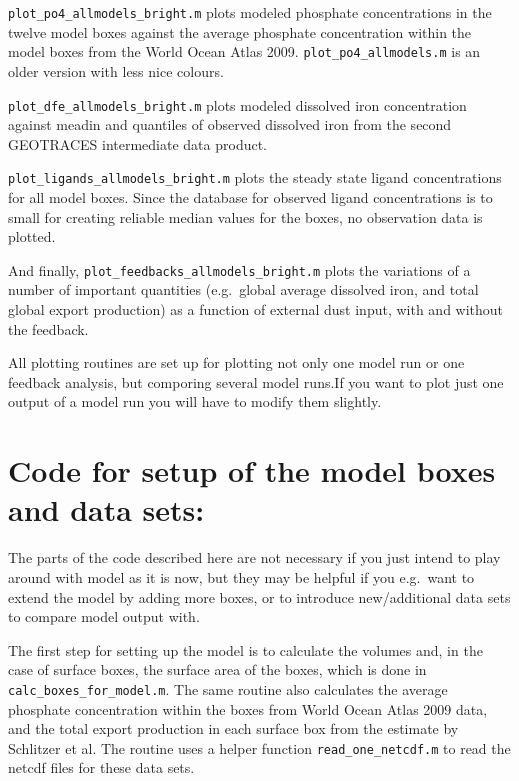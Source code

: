 \documentclass[a4paper]{scrartcl}
\begin{document}
\verb+plot_po4_allmodels_bright.m+ plots modeled phosphate
concentrations in the twelve model boxes against the average phosphate
concentration within the model boxes from the World Ocean Atlas
2009. \verb+plot_po4_allmodels.m+ is an older version with less nice
colours.

\verb+plot_dfe_allmodels_bright.m+ plots modeled dissolved iron
concentration against meadin and quantiles of observed dissolved iron
from the second GEOTRACES intermediate data product.

\verb+plot_ligands_allmodels_bright.m+ plots the steady state ligand
concentrations for all model boxes. Since the database for observed
ligand concentrations is to small for creating reliable median values
for the boxes, no observation data is plotted.

And finally, \verb+plot_feedbacks_allmodels_bright.m+ plots the
variations of a number of important quantities (e.g.\ global average
dissolved iron, and total global export production) as a function of
external dust input, with and without the feedback.

All plotting routines are set up for plotting not only one model run
or one feedback analysis, but comporing several model runs.If you want
to plot just one output of a model run you will have to modify them
slightly.

\section{Code for setup of the model boxes and data sets:}

The parts of the code described here are not necessary if you just
intend to play around with model as it is now, but they may be helpful
if you e.g.\ want to extend the model by adding more boxes, or to
introduce new/additional data sets to compare model output with.

The first step for setting up the model is to calculate the volumes
and, in the case of surface boxes, the surface area of the boxes,
which is done in \verb+calc_boxes_for_model.m+. The same routine also
calculates the average phosphate concentration within the boxes from
World Ocean Atlas 2009 data, and the total export production in each
surface box from the estimate by Schlitzer et al.  The routine uses a
helper function \verb+read_one_netcdf.m+ to read the netcdf files for
these data sets.
\end{document}
